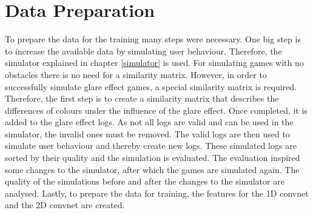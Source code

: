 \chapter{Data Preparation}
\label{data_preparation}
%	
%	
To prepare the data for the training many steps were necessary. One big step is to increase the available data by simulating user behaviour. Therefore, the simulator explained in chapter \ref{simulator}  is used. For simulating games with no obstacles there is no need for a similarity matrix. However, in order to successfully simulate glare effect games, a special similarity matrix is required. Therefore, the first step is to create a similarity matrix that describes the differences of colours under the influence of the glare effect. Once completed, it is added to the glare effect logs. As not all logs are valid and can be used in the simulator, the invalid ones must be removed. The valid logs are then used to simulate user behaviour and thereby create new logs. These simulated logs are sorted by their quality and the simulation is evaluated. The evaluation inspired some changes to the simulator, after which the games are simulated again. The quality of the simulations before and after the changes to the simulator are analysed. Lastly, to prepare the data for training, the features for the 1D convnet and the 2D convnet are created. 


